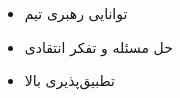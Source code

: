 \twocolumnsection
{
\begin{skills}
\end{skills}}
{
\vspace{1em}
\begin{itemize}
	\item توانایی رهبری تیم
	\item حل مسئله و تفکر انتقادی
    \item تطبیق‌پذیری بالا
\end{itemize}
}
